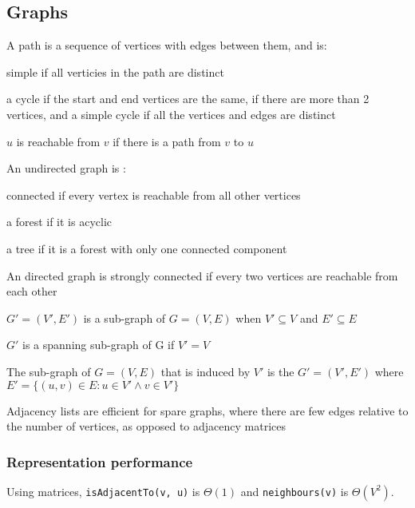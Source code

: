 \documentclass[10pt, a4paper,landscape]{article}
\begin{document}
\begin{multicols*}{4}
\subsection{Graphs}
\begin{compactitem}
    \item A path is a sequence of vertices with edges between them, and is:
    \item \begin{compactitem}
        \item simple if all verticies in the path are distinct
        \item a cycle if the start and end vertices are the same, if there are more than 2 vertices, and a simple cycle if all the vertices and edges are distinct
        \end{compactitem}
    \item $u$ is reachable from $v$ if there is a path from $v$ to $u$
    \item An undirected graph is :
        \begin{compactitem}
            \item connected if every vertex is reachable from all other vertices
            \item a forest if it is acyclic
            \item a tree if it is a forest with only one connected component
        \end{compactitem}
    \item An directed graph is strongly connected if every two vertices are reachable from each other
    \item $G' = (V', E')$ is a sub-graph of $G = (V, E)$ when $V' \subseteq V$ and $E' \subseteq E$
    \item $G'$ is a spanning sub-graph of G if $V' = V$
    \item The sub-graph of $G = (V, E)$ that is induced by $V'$ is the $G' = (V', E')$ where $E' = \{(u, v) \in E: u \in V' \wedge v \in V' \}$
    \item Adjacency lists are efficient for spare graphs, where there are few edges relative to the number of vertices, as opposed to adjacency matrices
\end{compactitem}

\subsubsection{Representation performance}
Using matrices, \texttt{isAdjacentTo(v, u)} is $\Theta(1)$ and \texttt{neighbours(v)} is $\Theta(V^2)$.


\end{multicols*}
\end{document}

